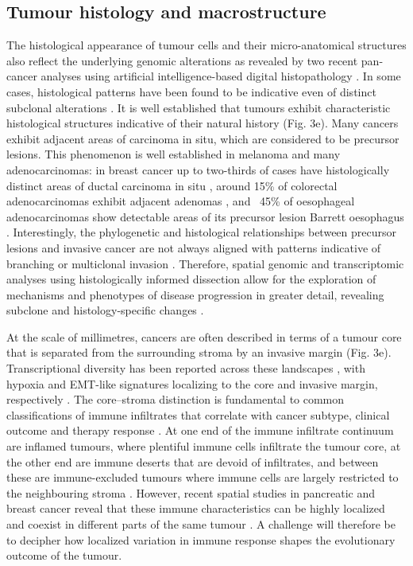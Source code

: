\subsection*{Tumour histology and macrostructure}

The histological appearance of tumour cells and their micro-anatomical structures also reflect the underlying genomic alterations as revealed by two recent pan-cancer analyses using artificial intelligence-based digital histopathology \parencite{Kather2020-bt,Fu2020-cp}. In some cases, histological patterns have been found to be indicative even of distinct subclonal alterations \parencite{Lomakin2022-ks,Coudray2018-jm,Loeffler2022-xj}. It is well established that tumours exhibit characteristic histological structures indicative of their natural history (Fig. 3e). Many cancers exhibit adjacent areas of carcinoma in situ, which are considered to be precursor lesions. This phenomenon is well established in melanoma \parencite{Nirmal2022-sq} and many adenocarcinomas: in breast cancer up to two-thirds of cases have histologically distinct areas of ductal carcinoma in situ \parencite{Kole2019-hl}, around 15\% of colorectal adenocarcinomas exhibit adjacent adenomas \parencite{Ponz_de_Leon1990-zy}, and ~45\% of oesophageal adenocarcinomas show detectable areas of its precursor lesion Barrett oesophagus \parencite{Sawas2018-mt}. Interestingly, the phylogenetic and histological relationships between precursor lesions and invasive cancer are not always aligned with patterns indicative of branching \parencite{Ross-Innes2015-sq,Stachler2015-ca} or multiclonal invasion \parencite{Casasent2018-gx}. Therefore, spatial genomic and transcriptomic analyses using histologically informed dissection allow for the exploration of mechanisms and phenotypes of disease progression in greater detail, revealing subclone and histology-specific changes \parencite{Lomakin2022-ks}.

At the scale of millimetres, cancers are often described in terms of a tumour core that is separated from the surrounding stroma by an invasive margin (Fig. 3e). Transcriptional diversity has been reported across these landscapes \parencite{Berglund2018-gh}, with hypoxia and \ac{EMT}-like signatures localizing to the core and invasive margin, respectively \parencite{Puram2017-mn,Thomlinson1955-em}. The core–stroma distinction is fundamental to common classifications of immune infiltrates that correlate with cancer subtype, clinical outcome and therapy response \parencite{Hammerl2021-fs,Keren2018-or,Galon2014-oi}. At one end of the immune infiltrate continuum are inflamed tumours, where plentiful immune cells infiltrate the tumour core, at the other end are immune deserts that are devoid of infiltrates, and between these are immune-excluded tumours where immune cells are largely restricted to the neighbouring stroma \parencite{Hegde2020-sw}. However, recent spatial studies in pancreatic and breast cancer reveal that these immune characteristics can be highly localized and coexist in different parts of the same tumour \parencite{Danenberg2022-zb,Grunwald2021-zk,Tavernari2021-yb}. A challenge will therefore be to decipher how localized variation in immune response shapes the evolutionary outcome of the tumour.

